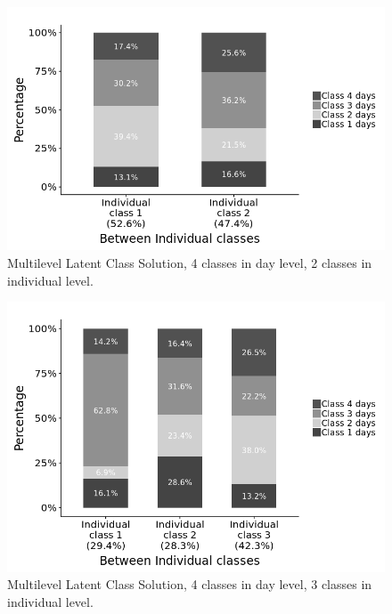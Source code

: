 \begin{figure}[H]
	\centering
	\includegraphics[width=13cm]{Figures/CW4CB2.png}
	\decoRule
	\caption[Multilevel Latent Class Solution (4 $\times$ 2).]{Multilevel Latent Class Solution, 4 classes in day level, 2 classes in individual level.}
	\label{fig:CW4CB2}
\end{figure}


\begin{figure}[H]
	\centering
	\includegraphics[width=13cm]{Figures/CW4CB3.png}
	\decoRule
	\caption[Multilevel Latent Class Solution (4 $\times$ 3).]{Multilevel Latent Class Solution, 4 classes in day level, 3 classes in individual level.}
	\label{fig:CW4CB3}
\end{figure}